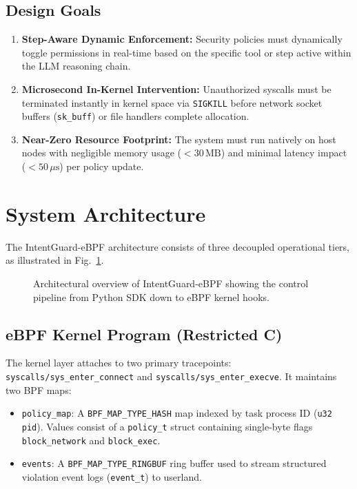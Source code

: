 \documentclass[conference]{IEEEtran}
\begin{document}
\subsection{Design Goals}
\begin{enumerate}
    \item \textbf{Step-Aware Dynamic Enforcement:} Security policies must dynamically toggle permissions in real-time based on the specific tool or step active within the LLM reasoning chain.
    \item \textbf{Microsecond In-Kernel Intervention:} Unauthorized syscalls must be terminated instantly in kernel space via \texttt{SIGKILL} before network socket buffers (\texttt{sk\_buff}) or file handlers complete allocation.
    \item \textbf{Near-Zero Resource Footprint:} The system must run natively on host nodes with negligible memory usage ($<30\,\text{MB}$) and minimal latency impact ($<50\,\mu\text{s}$) per policy update.
\end{enumerate}

\section{System Architecture}

The IntentGuard-eBPF architecture consists of three decoupled operational tiers, as illustrated in Fig.~\ref{fig:arch}.

\begin{figure}[htbp]
\centering
{}
\caption{Architectural overview of IntentGuard-eBPF showing the control pipeline from Python SDK down to eBPF kernel hooks.}
\label{fig:arch}
\end{figure}

\subsection{eBPF Kernel Program (Restricted C)}
The kernel layer attaches to two primary tracepoints: \texttt{syscalls/sys\_enter\_connect} and \texttt{syscalls/sys\_enter\_execve}. It maintains two BPF maps:
\begin{itemize}
    \item \texttt{policy\_map}: A \texttt{BPF\_MAP\_TYPE\_HASH} map indexed by task process ID (\texttt{u32 pid}). Values consist of a \texttt{policy\_t} struct containing single-byte flags \texttt{block\_network} and \texttt{block\_exec}.
    \item \texttt{events}: A \texttt{BPF\_MAP\_TYPE\_RINGBUF} ring buffer used to stream structured violation event logs (\texttt{event\_t}) to userland.
\end{itemize}
\end{document}
